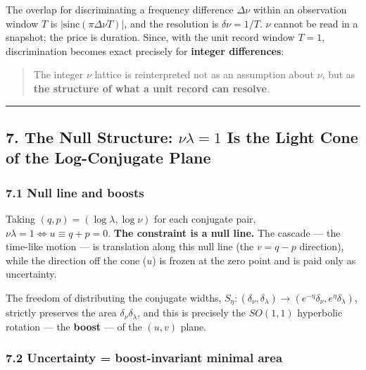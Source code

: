 \documentclass[
]{ltjsarticle}
\begin{document}
The overlap for discriminating a frequency difference \(\Delta\nu\)
within an observation window \(T\) is
\(|\mathrm{sinc}(\pi\Delta\nu T)|\), and the resolution is
\(\delta\nu=1/T\). \(\nu\) cannot be read in a snapshot; the price is
duration. Since, with the unit record window \(T=1\), discrimination
becomes exact precisely for \textbf{integer differences}:

\begin{quote}
The integer \(\nu\) lattice is reinterpreted not as an assumption about
\(\nu\), but as \textbf{the structure of what a unit record can
resolve}.
\end{quote}

\begin{center}\rule{0.5\linewidth}{0.5pt}\end{center}

\subsection{\texorpdfstring{7. The Null Structure: \(\nu\lambda=1\) Is
the Light Cone of the Log-Conjugate
Plane}{7. The Null Structure: \textbackslash nu\textbackslash lambda=1 Is the Light Cone of the Log-Conjugate Plane}}\label{the-null-structure-nulambda1-is-the-light-cone-of-the-log-conjugate-plane}

\subsubsection{7.1 Null line and boosts}\label{null-line-and-boosts}

Taking \((q,p)=(\log\lambda,\log\nu)\) for each conjugate pair,
\(\nu\lambda=1\iff u\equiv q+p=0\). \textbf{The constraint is a null
line.} The cascade --- the time-like motion --- is translation along
this null line (the \(v=q-p\) direction), while the direction off the
cone (\(u\)) is frozen at the zero point and is paid only as
uncertainty.

The freedom of distributing the conjugate widths,
\(S_\eta:(\delta_\nu,\delta_\lambda)\to(e^{-\eta}\delta_\nu,e^{\eta}\delta_\lambda)\),
strictly preserves the area \(\delta_\nu\delta_\lambda\), and this is
precisely the \(SO(1,1)\) hyperbolic rotation --- the \textbf{boost} ---
of the \((u,v)\) plane.

\subsubsection{7.2 Uncertainty = boost-invariant minimal
area}\label{uncertainty-boost-invariant-minimal-area}
\end{document}
